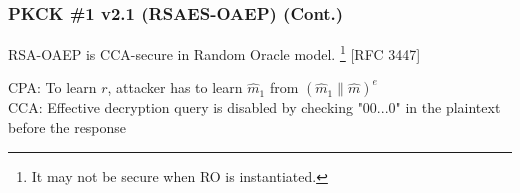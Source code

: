 \begin{frame}\frametitle{PKCK \#1 v2.1 (RSAES-OAEP) (Cont.)}
RSA-OAEP is CCA-secure in Random Oracle model. \footnote{It may not be secure when RO is instantiated.} [RFC 3447]
\begin{figure}
\begin{center}

\end{center}
\end{figure}
CPA: To learn $r$, attacker has to learn $\hat{m}_1$ from $(\hat{m}_1\|\hat{m})^e$\\

CCA: Effective decryption query is disabled by checking "00...0" in the plaintext before the response\\

\end{frame}

